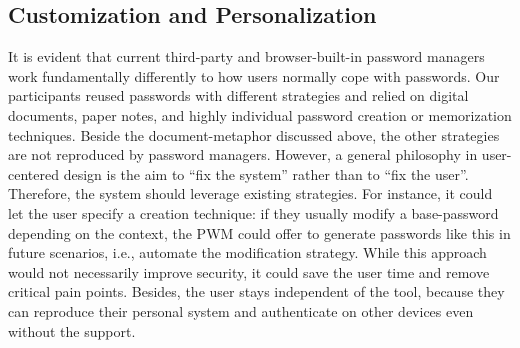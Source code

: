 
\subsection{Customization and Personalization}
It is evident that current third-party and browser-built-in password managers work fundamentally differently to how users normally cope with passwords. Our participants reused passwords with different strategies and relied on digital documents, paper notes, and highly individual password creation or memorization techniques. Beside the document-metaphor discussed above, the other strategies are not reproduced by password managers. However, a general philosophy in user-centered design is the aim to ``fix the system'' rather than to ``fix the user''. Therefore, the system should leverage existing strategies. For instance, it could let the user specify a creation technique: if they usually modify a base-password depending on the context, the PWM could offer to generate passwords like this in future scenarios, i.e., automate the modification strategy. While this approach would not necessarily improve security, it could save the user time and remove critical pain points. Besides, the user stays independent of the tool, because they can reproduce their personal system and authenticate on other devices even without the support. 



